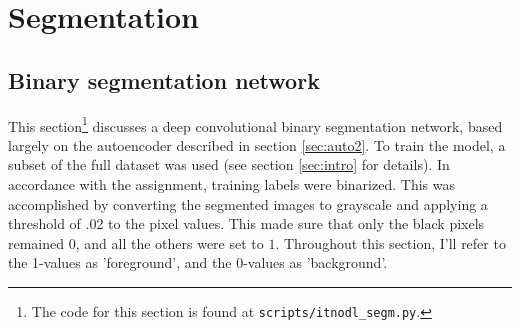 

\section{Segmentation}
\label{sec:segm}







\subsection{Binary segmentation network}
\label{sec:segm_1}

This section\footnote{The code for this section is found at \texttt{scripts/itnodl\_segm.py}.
} discusses a deep convolutional binary segmentation network, based largely on the autoencoder described in section \textcolor{blue}{\ref{sec:auto2}}. To train the model, a subset of the full dataset was used (see section \textcolor{blue}{\ref{sec:intro}} for details). In accordance with the assignment, training labels were binarized. This was accomplished by converting the segmented images to grayscale and applying a threshold of .02 to the pixel values. This made sure that only the black pixels remained $0$, and all the others were set to $1$. Throughout this section, I'll refer to the 1-values as 'foreground', and the 0-values as 'background'.

